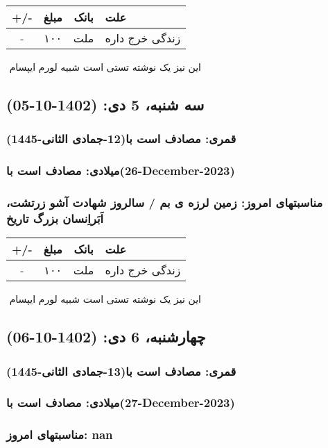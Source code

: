 \documentclass{article}
\newcommand{\rnote}[1]{\marginpar{\textcolor{color}{\StrSubstitute{\##1}{ }{\_}}}}
\newcommand{\myRow}[4]{
    #1 & #2 & #3 & #4 \\ \hline
}
\begin{document}
\begin{tabular}{ | c | c | c | p{5cm} |}
    \hline
    \myRow{ +/- }{مبلغ}{بانک}{علت}
    \myRow{-}{۱۰۰}{ملت}{زندگی خرج داره}
\end{tabular}
\newline
\newline

‌
\rnote{تست}
این نیز یک نوشته تستی است شبیه لورم ایپسام




\newpage
{}
\textcolor{color}{
\section{ سه شنبه، 5 دی: (1402-10-05) }
\subsubsection*{قمری: مصادف است با(12-جمادی الثانی-1445)} 
\subsubsection*{میلادی: مصادف است با(26-December-2023)}
\subsubsection*{مناسبتهای امروز: زمین لرزه ی بم / سالروز شهادت آشو زرتشت، اَبَراِنسان بزرگ تاریخ}
}


\begin{tabular}{ | c | c | c | p{5cm} |}
    \hline
    \myRow{ +/- }{مبلغ}{بانک}{علت}
    \myRow{-}{۱۰۰}{ملت}{زندگی خرج داره}
\end{tabular}
\newline
\newline

‌
\rnote{تست}
این نیز یک نوشته تستی است شبیه لورم ایپسام




\newpage
{}
\textcolor{color}{
\section{ چهارشنبه، 6 دی: (1402-10-06) }
\subsubsection*{قمری: مصادف است با(13-جمادی الثانی-1445)} 
\subsubsection*{میلادی: مصادف است با(27-December-2023)}
\subsubsection*{مناسبتهای امروز: nan}
}
\end{document}
